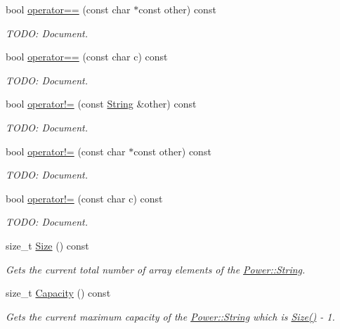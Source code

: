 \begin{DoxyCompactItemize}
bool \hyperlink{class_power_1_1_string_ae357277377a5d612450fcf852ba5bee9}{operator==} (const char $\ast$const other) const
\begin{DoxyCompactList}\small\item\em T\+O\+DO\+: Document. \end{DoxyCompactList}\item 
bool \hyperlink{class_power_1_1_string_a9a5cf72ccd272199f2eeb4baeaf7789f}{operator==} (const char c) const
\begin{DoxyCompactList}\small\item\em T\+O\+DO\+: Document. \end{DoxyCompactList}\item 
bool \hyperlink{class_power_1_1_string_a554a6ff1a319237b53d978ed3ef18f07}{operator!=} (const \hyperlink{class_power_1_1_string}{String} \&other) const
\begin{DoxyCompactList}\small\item\em T\+O\+DO\+: Document. \end{DoxyCompactList}\item 
bool \hyperlink{class_power_1_1_string_a267b8f261bcafb9ec6d86cfe12494c94}{operator!=} (const char $\ast$const other) const
\begin{DoxyCompactList}\small\item\em T\+O\+DO\+: Document. \end{DoxyCompactList}\item 
bool \hyperlink{class_power_1_1_string_a3216ffa5d292b08997d1c93d3c33251e}{operator!=} (const char c) const
\begin{DoxyCompactList}\small\item\em T\+O\+DO\+: Document. \end{DoxyCompactList}\item 
size\+\_\+t \hyperlink{class_power_1_1_string_aa62245fcf9bd8261b4b13c558dc45daf}{Size} () const
\begin{DoxyCompactList}\small\item\em Gets the current total number of array elements of the \hyperlink{class_power_1_1_string}{Power\+::\+String}. \end{DoxyCompactList}\item 
size\+\_\+t \hyperlink{class_power_1_1_string_aa25a140140cd4fe69b04d70a794c8394}{Capacity} () const
\begin{DoxyCompactList}\small\item\em Gets the current maximum capacity of the \hyperlink{class_power_1_1_string}{Power\+::\+String} which is \hyperlink{class_power_1_1_string_aa62245fcf9bd8261b4b13c558dc45daf}{Size()} -\/ 1. \end{DoxyCompactList}\item 

\end{DoxyCompactItemize}
